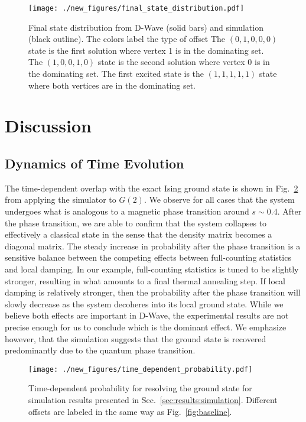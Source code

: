 \documentclass[prd,twocolumn,tightenlines,preprintnumbers,showpacs,superscriptaddress,notitlepage,nofootinbib,eqsecnum,floatfix,longbibliography,aps,10pt]{revtex4-2}
\begin{document}
\begin{figure}
	\centering
	\texttt{[image: ./new\_figures/final\_state\_distribution.pdf]}
	\caption{Final state distribution from D-Wave (solid bars) and simulation (black outline). The colors label the type of offset  The $(0, 1, 0, 0, 0)$ state is the first solution where vertex 1 is in the dominating set. The $(1, 0, 0, 1, 0)$ state is the second solution where vertex 0 is in the dominating set. The first excited state is the $(1, 1, 1, 1, 1)$ state where both vertices are in the dominating set.}
	\label{fig:final_state_distribution}
\end{figure}


\section{Discussion}

\subsection{Dynamics of Time Evolution}
\label{sec:discussion:time_evolution}

The time-dependent overlap with the exact Ising ground state is shown in Fig.~\ref{fig:td_prob} from applying the simulator to $G(2)$. We observe for all cases that the system undergoes what is analogous to a magnetic phase transition around $s\sim 0.4$.
After the phase transition, we are able to confirm that the system collapses to effectively a classical state in the sense that the density matrix becomes a diagonal matrix.
The steady increase in probability after the phase transition is a sensitive balance between the competing effects between full-counting statistics and local damping.
In our example, full-counting statistics is tuned to be slightly stronger, resulting in what amounts to a final thermal annealing step.
If local damping is relatively stronger, then the probability after the phase transition will slowly decrease as the system decoheres into its local ground state.
While we believe both effects are important in D-Wave, the experimental results are not precise enough for us to conclude which is the dominant effect.
We emphasize however, that the simulation suggests that the ground state is recovered predominantly due to the quantum phase transition.

\begin{figure}
	\centering
	\texttt{[image: ./new\_figures/time\_dependent\_probability.pdf]}
	\caption{Time-dependent probability for resolving the ground state for simulation results presented in Sec.~\ref{sec:results:simulation}. Different offsets are labeled in the same way as Fig.~\ref{fig:baseline}.}
	\label{fig:td_prob}
\end{figure}
\end{document}
